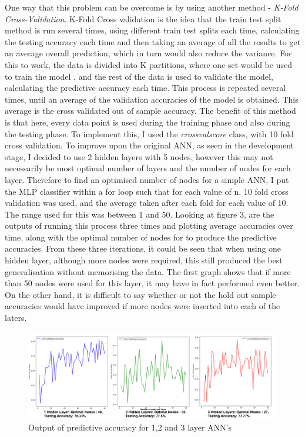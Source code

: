 \documentclass[11pt]{article}
\begin{document}
One way that this problem can be overcome is by using another method - \textit{K-Fold Cross-Validation}. K-Fold Cross validation is the idea that the train test split method is run several times, using different train test splits each time, calculating the testing accuracy each time and then taking an average of all the results to get an average overall prediction, which in turn would also reduce the variance. For this to work, the data is divided into K partitions, where one set would be used to train the model , and the rest of the data is used to validate the model, calculating the predictive accuracy each time. This process is repeated several times, until an average of the validation accuracies of the model is obtained. This average is the cross validated out of sample accuracy.  The benefit of this method is that here, every data point is used during the training phase and also during the testing phase. To implement this, I used the \textit{cross\textunderscore val\textunderscore score} class, with 10 fold cross validation. To improve upon the original ANN, as seen in the development stage, I decided to use 2 hidden layers with 5 nodes, however this may not necessarily be most optimal number of layers and the number of nodes for each layer. Therefore to find an optimised number of nodes for a simple ANN, I put the MLP classifier within a for loop such that for each value of n, 10 fold cross validation was used, and the average taken after each fold for each value of 10. The range used for this was between 1 and 50. Looking at figure 3, are the outputs of running this process three times and plotting average accuracies over time, along with the optimal number of nodes for to produce the predictive accuracies. From these three iterations, it could be seen that when using one hidden layer, although more nodes were required, this still produced the best generalisation without memorising the data. The first graph shows that if more than 50 nodes were used for this layer, it may have in fact performed even better. On the other hand, it is difficult to say whether or not the hold out sample accuracies would have improved if more nodes were inserted into each of the laters. 
\begin{figure}[h]
\centering
\includegraphics[scale = .50]{graph}
\caption{Output of predictive accuracy for 1,2 and 3 layer ANN's} 
\end{figure}
\end{document}
